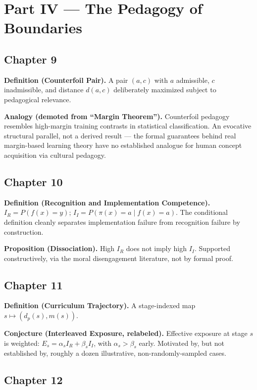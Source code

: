 \section*{Part IV --- The Pedagogy of Boundaries}

\subsection*{Chapter 9}

\textbf{Definition (Counterfoil Pair).} A pair $(a,c)$ with $a$ admissible, $c$ inadmissible, and distance $d(a,c)$ deliberately maximized subject to pedagogical relevance.

\textbf{Analogy (demoted from ``Margin Theorem'').} Counterfoil pedagogy resembles high-margin training contrasts in statistical classification. An evocative structural parallel, not a derived result --- the formal guarantees behind real margin-based learning theory have no established analogue for human concept acquisition via cultural pedagogy.

\subsection*{Chapter 10}

\textbf{Definition (Recognition and Implementation Competence).} $I_R = P(f(x)=y)$; $I_I = P(\pi(x)=a \mid f(x)=a)$. The conditional definition cleanly separates implementation failure from recognition failure by construction.

\textbf{Proposition (Dissociation).} High $I_R$ does not imply high $I_I$. Supported constructively, via the moral disengagement literature, not by formal proof.

\subsection*{Chapter 11}

\textbf{Definition (Curriculum Trajectory).} A stage-indexed map $s \mapsto (d_p(s), m(s))$.

\textbf{Conjecture (Interleaved Exposure, relabeled).} Effective exposure at stage $s$ is weighted: $E_s = \alpha_s I_R + \beta_s I_I$, with $\alpha_s > \beta_s$ early. Motivated by, but not established by, roughly a dozen illustrative, non-randomly-sampled cases.

\subsection*{Chapter 12}

